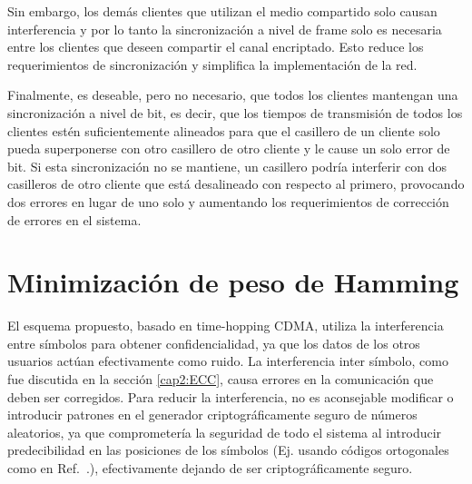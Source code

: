 Sin embargo, los demás clientes que utilizan el medio compartido solo causan interferencia y por lo tanto la sincronización a nivel de frame solo es necesaria entre los clientes que deseen compartir el canal encriptado. Esto reduce los requerimientos de sincronización y simplifica la implementación de la red.

Finalmente, es deseable, pero no necesario, que todos los clientes mantengan una sincronización a nivel de bit, es decir, que los tiempos de transmisión de todos los clientes estén suficientemente alineados para que el casillero de un cliente solo pueda superponerse con otro casillero de otro cliente y le cause un solo error de bit. Si esta sincronización no se mantiene, un casillero podría interferir con dos casilleros de otro cliente que está desalineado con respecto al primero, provocando dos errores en lugar de uno solo y aumentando los requerimientos de corrección de errores en el sistema.

\section{Minimización de peso de Hamming}
\label{miniham}
El esquema propuesto, basado en time-hopping CDMA, utiliza la interferencia entre símbolos para obtener confidencialidad, ya que los datos de los otros usuarios actúan efectivamente como ruido.
La interferencia inter símbolo, como fue discutida en la sección \ref{cap2:ECC}, causa errores en la comunicación que deben ser corregidos. Para reducir la interferencia, no es aconsejable modificar o introducir patrones en el generador criptográficamente seguro de números aleatorios, ya que comprometería la seguridad de todo el sistema al introducir predecibilidad en las posiciones de los símbolos (Ej. usando códigos ortogonales como en Ref.~\cite{Nadarajah2006}.), efectivamente dejando de ser criptográficamente seguro.


